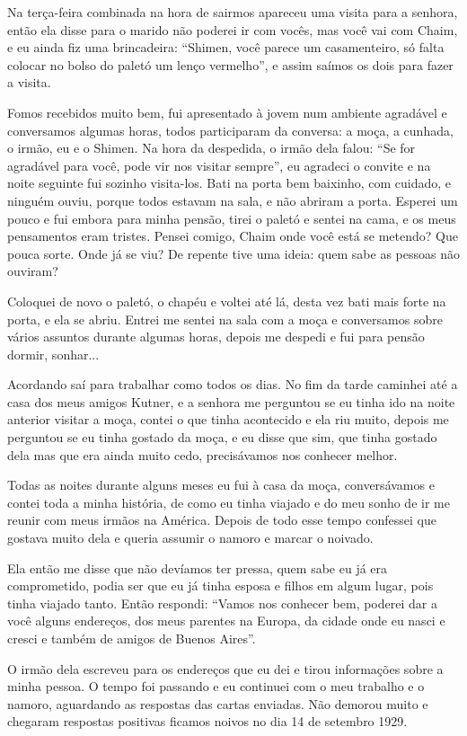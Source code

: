 Na terça-feira combinada na hora de sairmos apareceu uma visita para a
senhora, então ela disse para o marido não poderei ir com vocês, mas
você vai com Chaim, e eu ainda fiz uma brincadeira: ``Shimen, você
parece um casamenteiro, só falta colocar no bolso do paletó um lenço
vermelho'', e assim saímos os dois para fazer a visita.

Fomos recebidos muito bem, fui apresentado à jovem num ambiente
agradável e conversamos algumas horas, todos participaram da conversa: a
moça, a cunhada, o irmão, eu e o Shimen. Na hora da despedida, o irmão
dela falou: ``Se for agradável para você, pode vir nos visitar sempre'',
eu agradeci o convite e na noite seguinte fui sozinho visita-los. Bati
na porta bem baixinho, com cuidado, e ninguém ouviu, porque todos
estavam na sala, e não abriram a porta. Esperei um pouco e fui embora
para minha pensão, tirei o paletó e sentei na cama, e os meus
pensamentos eram tristes. Pensei comigo, Chaim onde você está se
metendo? Que pouca sorte. Onde já se viu? De repente tive uma ideia:
quem sabe as pessoas não ouviram?

Coloquei de novo o paletó, o chapéu e voltei até lá, desta vez bati mais
forte na porta, e ela se abriu. Entrei me sentei na sala com a moça e
conversamos sobre vários assuntos durante algumas horas, depois me
despedi e fui para pensão dormir, sonhar...

Acordando saí para trabalhar como todos os dias. No fim da tarde
caminhei até a casa dos meus amigos Kutner, e a senhora me perguntou se
eu tinha ido na noite anterior visitar a moça, contei o que tinha
acontecido e ela riu muito, depois me perguntou se eu tinha gostado da
moça, e eu disse que sim, que tinha gostado dela mas que era ainda muito
cedo, precisávamos nos conhecer melhor.

Todas as noites durante alguns meses eu fui à casa da moça,
conversávamos e contei toda a minha história, de como eu tinha viajado e
do meu sonho de ir me reunir com meus irmãos na América. Depois de todo
esse tempo confessei que gostava muito dela e queria assumir o namoro e
marcar o noivado.

Ela então me disse que não devíamos ter pressa, quem sabe eu já era
comprometido, podia ser que eu já tinha esposa e filhos em algum lugar,
pois tinha viajado tanto. Então respondi: ``Vamos nos conhecer bem,
poderei dar a você alguns endereços, dos meus parentes na Europa, da
cidade onde eu nasci e cresci e também de amigos de Buenos Aires''.

O irmão dela escreveu para os endereços que eu dei e tirou informações
sobre a minha pessoa. O tempo foi passando e eu continuei com o meu
trabalho e o namoro, aguardando as respostas das cartas enviadas. Não
demorou muito e chegaram respostas positivas ficamos noivos no dia 14 de
setembro 1929.

